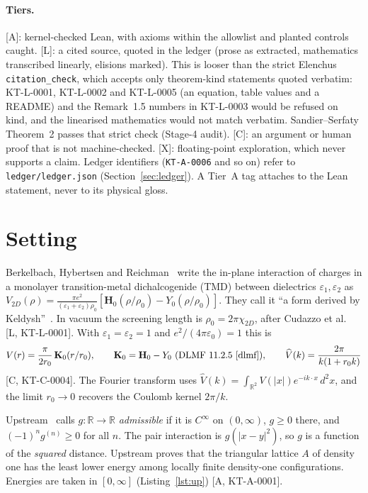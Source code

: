 \documentclass[11pt]{article}
\theoremstyle{remark}
\newcommand{\R}{\mathbb{R}}
\newcommand{\tier}[1]{\textsf{[#1]}}
\begin{document}
\paragraph{Tiers.} \tier{A}: kernel-checked Lean, with axioms within the allowlist and planted controls caught.
\tier{L}: a cited source, quoted in the ledger (prose as extracted, mathematics transcribed linearly, elisions
marked). This is looser than the strict Elenchus \texttt{citation\_check}, which accepts only theorem-kind statements
quoted verbatim: KT-L-0001, KT-L-0002 and KT-L-0005 (an equation, table values and a README) and the Remark~1.5 numbers
in KT-L-0003 would be refused on kind, and the linearised mathematics would not match verbatim. Sandier--Serfaty
Theorem~2 passes that strict check (Stage-4 audit). \tier{C}: an argument or human proof that is not
machine-checked. \tier{X}: floating-point exploration, which never supports a claim. Ledger identifiers
(\texttt{KT-A-0006} and so on) refer to \texttt{ledger/ledger.json} (Section~\ref{sec:ledger}). A Tier~A tag attaches to
the Lean statement, never to its physical gloss.

\section{Setting}\label{sec:setting}
Berkelbach, Hybertsen and Reichman~\cite{bhr} write the in-plane interaction of charges in a monolayer transition-metal
dichalcogenide (TMD) between dielectrics $\varepsilon_1,\varepsilon_2$ as
$V_{2D}(\rho)=\frac{\pi e^2}{(\varepsilon_1+\varepsilon_2)\rho_0}[\mathbf H_0(\rho/\rho_0)-Y_0(\rho/\rho_0)]$. They
call it ``a form derived by Keldysh''~\cite{keldysh}. In vacuum the screening length is $\rho_0=2\pi\chi_{2D}$, after
Cudazzo et al.~\cite{cudazzo} \tier{L, KT-L-0001}. With $\varepsilon_1=\varepsilon_2=1$ and $e^2/(4\pi\varepsilon_0)=1$
this is
\begin{equation}\label{eq:V}
V(r)=\frac{\pi}{2r_0}\,\mathbf K_0(r/r_0),\qquad \mathbf K_0=\mathbf H_0-Y_0\ \text{(DLMF 11.2.5~\cite{dlmf})},\qquad
\widehat V(k)=\frac{2\pi}{k(1+r_0k)}
\end{equation}
\tier{C, KT-C-0004}. The Fourier transform uses $\widehat V(k)=\int_{\R^2}V(|x|)e^{-ik\cdot x}\,d^2x$, and the limit
$r_0\to0$ recovers the Coulomb kernel $2\pi/k$.

Upstream~\cite{oai} calls $g:\R\to\R$ \emph{admissible} if it is $C^\infty$ on $(0,\infty)$, $g\ge0$ there, and
$(-1)^n g^{(n)}\ge0$ for all $n$. The pair interaction is $g(|x-y|^2)$, so $g$ is a function of the \emph{squared}
distance. Upstream proves that the triangular lattice $A$ of density one has the least lower energy among locally
finite density-one configurations. Energies are taken in $[0,\infty]$ (Listing~\ref{lst:up}) \tier{A, KT-A-0001}.
\end{document}
